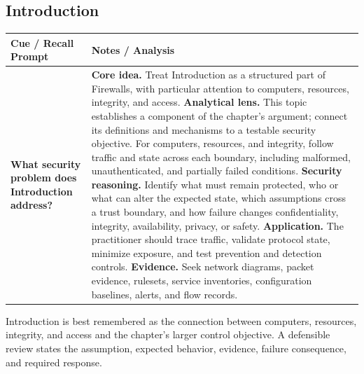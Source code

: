 \documentclass[11pt]{article}
\newcommand{\CornellHeader}{%
\rowcolor{Navy}\color{white}\bfseries Cue / Recall Prompt & \color{white}\bfseries Notes / Analysis\\\hline}
\newcommand{\CornellRow}[2]{%
\cellcolor{CueGray}\RaggedRight\textbf{#1} & \RaggedRight #2\\\hline}
\begin{document}
\subsection*{Introduction}
\begin{longtable}{>{\RaggedRight\arraybackslash}p{}|>{\RaggedRight\arraybackslash}p{}}
\CornellHeader
\CornellRow{What security problem does Introduction address?}{\textbf{Core idea.} Treat Introduction as a structured part of Firewalls, with particular attention to computers, resources, integrity, and access. \textbf{Analytical lens.} This topic establishes a component of the chapter's argument; connect its definitions and mechanisms to a testable security objective. For computers, resources, and integrity, follow traffic and state across each boundary, including malformed, unauthenticated, and partially failed conditions. \textbf{Security reasoning.} Identify what must remain protected, who or what can alter the expected state, which assumptions cross a trust boundary, and how failure changes confidentiality, integrity, availability, privacy, or safety. \textbf{Application.} The practitioner should trace traffic, validate protocol state, minimize exposure, and test prevention and detection controls. \textbf{Evidence.} Seek network diagrams, packet evidence, rulesets, service inventories, configuration baselines, alerts, and flow records.}
\end{longtable}
\begin{topicsummary}
Introduction is best remembered as the connection between computers, resources, integrity, and access and the chapter's larger control objective. A defensible review states the assumption, expected behavior, evidence, failure consequence, and required response.
\end{topicsummary}
\end{document}
